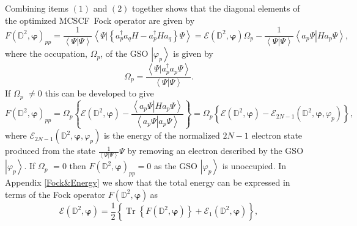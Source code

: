\documentclass[aps,preprint]{revtex4}%
\begin{document}
Combining items $\left(  1\right)  $ and $\left(  2\right)  $ together shows
that the diagonal elements of the optimized MCSCF\ Fock operator are given by
\begin{equation}
F\left(  \mathbb{D}^{2},\mathbf{\varphi}\right)  _{pp}=\frac{1}{\left\langle
\left.  \Psi\right\vert \Psi\right\rangle }\left\langle \left.  \Psi
\right\vert \left\{  a_{p}^{\dagger}a_{q}H-a_{p}^{\dagger}Ha_{q}\right\}
\Psi\right\rangle =\mathcal{E}\left(  \mathbb{D}^{2},\mathbf{\varphi}\right)
\Omega_{p}-\frac{1}{\left\langle \left.  \Psi\right\vert \Psi\right\rangle
}\left\langle \left.  a_{p}\Psi\right\vert Ha_{p}\Psi\right\rangle ,
\end{equation}
where the occupation, $\Omega_{p}$, of the GSO $\left\vert \varphi
_{p}\right\rangle $ is given by
\begin{equation}
\Omega_{p}=\frac{\left\langle \left.  \Psi\right\vert a_{p}^{\dagger}a_{p}%
\Psi\right\rangle }{\left\langle \left.  \Psi\right\vert \Psi\right\rangle }.
\end{equation}
If $\Omega_{p}$ $\neq0$ this can be developed to give
\begin{equation}
F\left(  \mathbb{D}^{2},\mathbf{\varphi}\right)  _{pp}=\Omega_{p}\left\{
\mathcal{E}\left(  \mathbb{D}^{2},\mathbf{\varphi}\right)  -\frac{\left\langle
\left.  a_{p}\Psi\right\vert Ha_{p}\Psi\right\rangle }{\left\langle \left.
a_{p}\Psi\right\vert a_{p}\Psi\right\rangle }\right\}  =\Omega_{p}\left\{
\mathcal{E}\left(  \mathbb{D}^{2},\mathbf{\varphi}\right)  -\mathcal{E}%
_{2N-1}\left(  \mathbb{D}^{2},\mathbf{\varphi,}\varphi_{p}\right)  \right\}  ,
\end{equation}
where $\mathcal{E}_{2N-1}\left(  \mathbb{D}^{2},\mathbf{\varphi,}\varphi
_{p}\right)  $ is the energy of the normalized $2N-1$ electron state produced
from the state $\frac{1}{\left\langle \left.  \Psi\right\vert \Psi
\right\rangle }\Psi$ by removing an electron described by the GSO\ $\left\vert
\varphi_{p}\right\rangle $. If $\Omega_{p}$ $=0$ then $F\left(  \mathbb{D}%
^{2},\mathbf{\varphi}\right)  _{pp}=0$ as the GSO $\left\vert \varphi
_{p}\right\rangle $ is unoccupied. In Appendix \ref{Fock&Energy} we show that
the total energy can be expressed in terms of the Fock operator $F\left(
\mathbb{D}^{2},\mathbf{\varphi}\right)  \ $as
\begin{equation}
\mathcal{E}\left(  \mathbb{D}^{2},\mathbf{\varphi}\right)  =\frac{1}%
{2}\left\{  \overset{}{\operatorname{Tr}\left\{  F\left(  \mathbb{D}%
^{2},\mathbf{\varphi}\right)  \right\}  +\mathcal{E}_{1}\left(  \mathbb{D}%
^{2},\mathbf{\varphi}\right)  }\right\}  ,
\end{equation}
\end{document}
